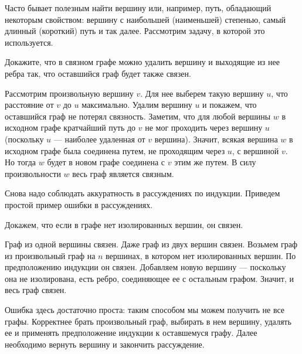 \begin{center}
\end{center}

Часто бывает полезным найти вершину или, например, путь, обладающий
некоторым свойством: вершину с наибольшей (наименьшей) степенью, самый
длинный (короткий) путь и так далее. Рассмотрим задачу, в которой это
используется.

\begin{task}
    Докажите, что в связном графе можно удалить вершину и выходящие из
    нее ребра так, что оставшийся граф будет также связен.
\end{task}

Рассмотрим произвольную вершину $v$. Для нее выберем такую вершину $u$,
что расстояние от $v$ до $u$ максимально. Удалим вершину $u$ и покажем,
что оставшийся граф не потерял связность. Заметим, что для любой вершины
$w$ в исходном графе кратчайший путь до $v$ не мог проходить через вершину
$u$ (поскольку $u$ --- наиболее удаленная от $v$ вершина). Значит, всякая
вершина $w$ в исходном графе была соединена путем, не проходящим через
$u$, с вершиной $v$. Но тогда $w$ будет в новом графе соединена с $v$
этим же путем. В силу произвольности $w$ весь граф является связным.

Снова надо соблюдать аккуратность в рассуждениях по индукции. Приведем
простой пример ошибки в рассуждениях.

\begin{example}
    Докажем, что если в графе нет изолированных вершин, он связен.
\end{example}

Граф из одной вершины связен. Даже граф из двух вершин связен.
Возьмем граф из произвольный граф на $n$ вершинах, в котором
нет изолированных вершин. По предположению индукции он связен.
Добавляем новую вершину --- поскольку она не изолирована, есть
ребро, соединяющее ее с остальным графом. Значит, и весь граф
связен.

Ошибка здесь достаточно проста: таким способом мы можем получить
не все графы. Корректнее брать произвольный граф, выбирать в нем
вершину, удалять ее и применять предположение индукции к оставшемуся
графу. Далее необходимо вернуть вершину и закончить рассуждение.
